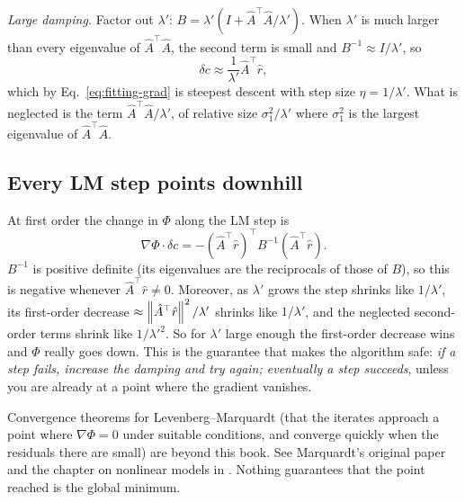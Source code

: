 \emph{Large damping.} Factor out $\lambda'$: $B=\lambda'(I+\hat A^\top\hat A/\lambda')$. When $\lambda'$ is much larger than every eigenvalue of $\hat A^\top\hat A$, the second term is small and $B^{-1}\approx I/\lambda'$, so
\[
\delta c\approx\frac{1}{\lambda'}\hat A^\top\hat r ,
\]
which by Eq.~\eqref{eq:fitting-grad} is steepest descent with step size $\eta=1/\lambda'$. What is neglected is the term $\hat A^\top\hat A/\lambda'$, of relative size $\sigma_1^2/\lambda'$ where $\sigma_1^2$ is the largest eigenvalue of $\hat A^\top\hat A$.

\subsection{Every LM step points downhill}

At first order the change in $\Phi$ along the LM step is
\[
\nabla\Phi\cdot\delta c=-(\hat A^\top\hat r)^\top B^{-1}(\hat A^\top\hat r).
\]
$B^{-1}$ is positive definite (its eigenvalues are the reciprocals of those of $B$), so this is negative whenever $\hat A^\top\hat r\neq0$. Moreover, as $\lambda'$ grows the step shrinks like $1/\lambda'$, its first-order decrease $\approx\left\lVert \hat A^\top\hat r\right\rVert^2/\lambda'$ shrinks like $1/\lambda'$, and the neglected second-order terms shrink like $1/\lambda'^2$. So for $\lambda'$ large enough the first-order decrease wins and $\Phi$ really goes down. This is the guarantee that makes the algorithm safe: \emph{if a step fails, increase the damping and try again; eventually a step succeeds}, unless you are already at a point where the gradient vanishes.

\begin{beyond}
Convergence theorems for Levenberg--Marquardt (that the iterates approach a point where $\nabla\Phi=0$ under suitable conditions, and converge quickly when the residuals there are small) are beyond this book. See Marquardt's original paper \cite{marquardt} and the chapter on nonlinear models in \cite{nr}. Nothing guarantees that the point reached is the global minimum.
\end{beyond}

